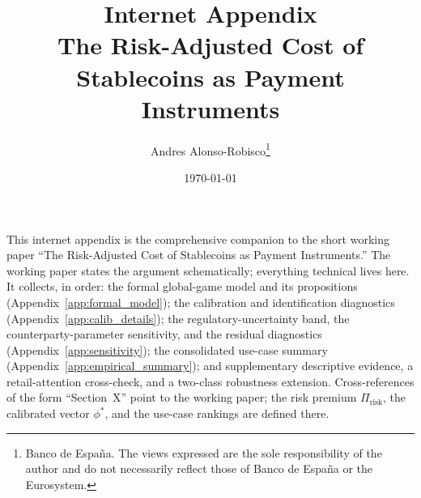 \documentclass[12pt]{article}
\title{Internet Appendix\\
The Risk-Adjusted Cost of Stablecoins as Payment Instruments}
\author{
Andres Alonso-Robisco\thanks{Banco de Espa\~na. The views expressed are the
sole responsibility of the author and do not necessarily reflect those of
Banco de Espa\~na or the Eurosystem.}
}
\date{\today}
\begin{document}
\maketitle
\onehalfspacing

\noindent This internet appendix is the comprehensive companion to the short working paper ``The Risk-Adjusted Cost of Stablecoins as Payment Instruments.'' The working paper states the argument schematically; everything technical lives here. It collects, in order: the formal global-game model and its propositions (Appendix~\ref{app:formal_model}); the calibration and identification diagnostics (Appendix~\ref{app:calib_details}); the regulatory-uncertainty band, the counterparty-parameter sensitivity, and the residual diagnostics (Appendix~\ref{app:sensitivity}); the consolidated use-case summary (Appendix~\ref{app:empirical_summary}); and supplementary descriptive evidence, a retail-attention cross-check, and a two-class robustness extension. Cross-references of the form ``Section~X'' point to the working paper; the risk premium $\Pi_{\text{risk}}$, the calibrated vector $\phi^*$, and the use-case rankings are defined there.

\appendix








\clearpage


\end{document}
